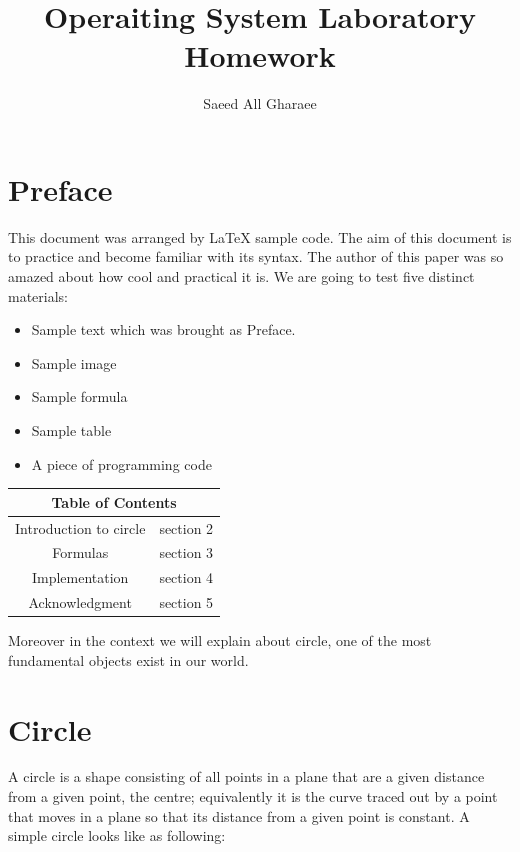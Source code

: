 \documentclass[12pt]{article}
\title{Operaiting System Laboratory Homework}
\author{Saeed All Gharaee}
\begin{document}
  \maketitle
\section{Preface}
  This document was arranged by LaTeX sample code. The aim of this document is to practice and become familiar with its syntax. The author of this paper was so amazed about how cool and practical it is. 
  We are going to test five distinct materials: 
  \begin{itemize}
    \item Sample text which was brought as Preface.
    \item Sample image
    \item Sample formula
    \item Sample table
    \item A piece of programming code    
  \end{itemize}
  
\begin{center}
\begin{tabular}{ |c|c| }
\hline
\multicolumn{2}{|c|}{Table of Contents}\\
 \hline
 Introduction to circle &  section 2 \\ 
  \hline
 Formulas & section 3 \\ 
  \hline
 Implementation & section 4 \\ 
  \hline
  Acknowledgment & section 5 \\
 \hline
\end{tabular}
\end{center}


Moreover in the context we will explain about circle, one of the most fundamental objects exist in our world.

\newpage
\section{Circle}
A circle is a shape consisting of all points in a plane that are a given distance from a given point, the centre; equivalently it is the curve traced out by a point that moves in a plane so that its distance from a given point is constant. 
A simple circle looks like as following:
\end{document}
